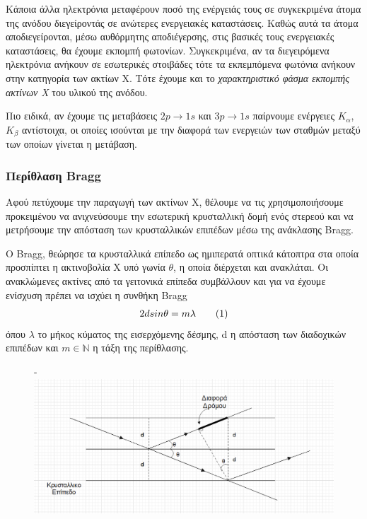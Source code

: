 \documentclass[a4paper]{article}
\newcommand\numberthis{\addtocounter{equation}{1}\tag{\theequation}}
\begin{document}
	Κάποια άλλα ηλεκτρόνια μεταφέρουν ποσό της ενέργειάς τους σε συγκεκριμένα άτομα της ανόδου διεγείροντάς σε ανώτερες ενεργειακές καταστάσεις. Καθώς αυτά τα άτομα αποδιεγείρονται, μέσω αυθόρμητης αποδιέγερσης, στις βασικές τους ενεργειακές καταστάσεις, θα έχουμε εκπομπή φωτονίων. Συγκεκριμένα, αν τα διεγειρόμενα ηλεκτρόνια ανήκουν σε εσωτερικές στοιβάδες τότε τα εκπεμπόμενα φωτόνια ανήκουν στην κατηγορία των ακτίων Χ. Τότε έχουμε και το \textit{χαρακτηριστικό φάσμα εκπομπής ακτίνων Χ} του υλικού της ανόδου. 
	
	Πιο ειδικά, αν έχουμε τις μεταβάσεις $2p\rightarrow1s$ και $3p\rightarrow1s$ παίρνουμε ενέργειες $K_\alpha$, $K_\beta$ αντίστοιχα, οι οποίες ισούνται με την διαφορά των ενεργειών των σταθμών μεταξύ των οποίων γίνεται η μετάβαση.
	
	\subsubsection*{Περίθλαση Bragg}
	
	Αφού πετύχουμε την παραγωγή των ακτίνων Χ, θέλουμε να τις χρησιμοποιήσουμε προκειμένου να ανιχνεύσουμε την εσωτερική κρυσταλλική δομή ενός στερεού και να μετρήσουμε την απόσταση των κρυσταλλικών επιπέδων μέσω της ανάκλασης Bragg.
	
	O Bragg, θεώρησε τα κρυσταλλικά επίπεδο ως ημιπερατά οπτικά κάτοπτρα στα οποία προσπίπτει η ακτινοβολία Χ υπό γωνία $\theta$, η οποία διέρχεται και ανακλάται. Οι ανακλώμενες ακτίνες από τα γειτονικά επίπεδα συμβάλλουν και για να έχουμε ενίσχυση πρέπει να ισχύει η συνθήκη Bragg
\begin{align*}\label{2}
2dsin\theta=m\lambda \numberthis
\end{align*}
όπου $\lambda$ το μήκος κύματος της εισερχόμενης δέσμης, d η απόσταση των διαδοχικών επιπέδων και $m\in \mathbb{N}$ η τάξη της περίθλασης. 
\begin{figure}[h!]-
	\centering
	\includegraphics[scale=0.4]{bragg.png}
\end{figure}
\end{document}
